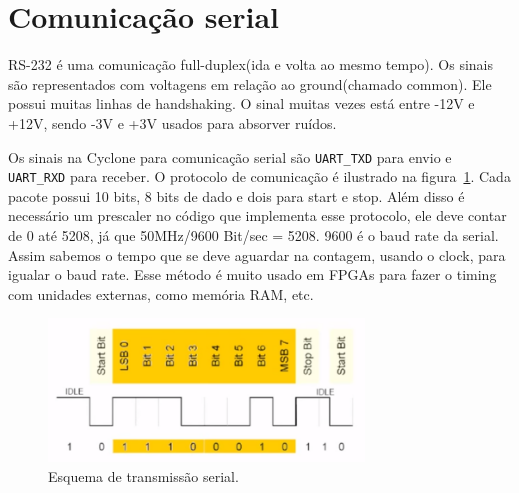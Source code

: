 \section{Comunicação serial}

RS-232 é uma comunicação full-duplex(ida e volta ao mesmo tempo). Os sinais são
representados com voltagens em relação ao ground(chamado common). Ele possui 
muitas linhas de handshaking. O sinal muitas vezes está entre -12V e +12V,
sendo -3V e +3V usados para absorver ruídos.

Os sinais na Cyclone para comunicação serial são \verb|UART_TXD| para envio e
\verb|UART_RXD| para receber. O protocolo de comunicação é ilustrado na 
figura~\ref{simulacao}. Cada pacote possui 10 bits, 8 bits de dado e dois para
start e stop. Além disso é necessário um prescaler no código que implementa esse
protocolo, ele deve contar de 0 até 5208, já que 50MHz/9600 Bit/sec = 5208. 9600
é o baud rate da serial. Assim sabemos o tempo que se deve aguardar na contagem,
usando o clock, para igualar o baud rate. Esse método é muito usado em FPGAs
para fazer o timing com unidades externas, como memória RAM, etc.

\begin{figure}[!h]
\centering
\includegraphics[width=3.3in]{img/uart.png}
\caption{Esquema de transmissão serial.}
\label{simulacao}
\end{figure}